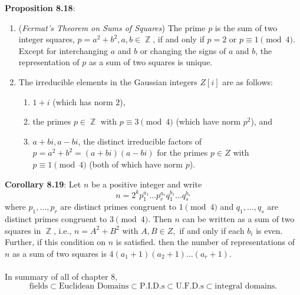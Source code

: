\documentclass{article}
\DeclareMathOperator{\Z}{\mathbb{Z}}
\begin{document}
\textbf{Proposition 8.18}: \begin{enumerate}
    \item (\textit{Fermat's Theorem on Sums of Squares}) The prime $p$ is the sum of two integer squares, $p = a^2 + b^2, a, b \in \Z$, if and only if $p = 2$ or $p \equiv 1 \pmod{4}$. Except for interchanging $a$ and $b$ or changing the signs of $a$ and $b$, the representation of $p$ as a sum of two squares is unique.
    \item  The irreducible elements in the Gaussian integers $Z[i]$ are as follows: \begin{enumerate}
        \item $1 + i$ (which has norm $2$),
        \item the primes $p \in \Z$ with $p \equiv 3 \pmod{4}$ (which have norm $p^2$), and
        \item $a + bi, a - bi$, the distinct irreducible factors of $p = a^2 + b^2 =  (a + bi)(a - bi)$ for the primes $p \in Z$ with $p \equiv 1 \pmod{4}$ (both of which have norm $p$).
    \end{enumerate}
\end{enumerate} $ $ \\
\textbf{Corollary 8.19}: Let $n$ be a positive integer and write $$n = 2^k p_1^{a_1} \dots p_r^{a_r} q_1^{b_1} \dots q_s^{b_s}$$ where $p_1, \dots, p_r$ are distinct primes congruent to $1 \pmod{4}$ and $q_1, \dots, q_s$ are distinct primes congruent to $3 \pmod{4}$. Then $n$ can be written as a sum of two squares in $\Z$, i.e., $n = A^2 + B^2$ with $A, B \in Z,$ if and only if each $b_i$ is even. Further, if this condition on $n$ is satisfied. then the number of representations of $n$ as a sum of two squares is $4(a_1 + 1)(a_2 + 1) \dots (a_r + 1)$. \\ \\
In summary of all of chapter 8, $$\text{fields} \subset \text{Euclidean Domains} \subset \text{P.I.D.s} \subset \text{U.F.D.s} \subset \text{integral domains}.$$
\end{document}
